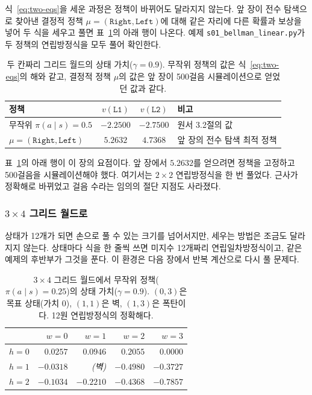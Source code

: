 \documentclass[11pt,a4paper]{article}
\newcommand{\Lone}{\texttt{L1}}
\newcommand{\Ltwo}{\texttt{L2}}
\begin{document}
식~\eqref{eq:two-eqs}을 세운 과정은 정책이 바뀌어도 달라지지 않는다. 앞 장이 전수 탐색으로 찾아낸
결정적 정책 $\mu=(\texttt{Right},\texttt{Left})$에 대해 같은 자리에 다른 확률과 보상을 넣어 두 식을
세우고 풀면 표~\ref{tab:two-square-values}의 아래 행이 나온다. 예제
\texttt{s01\_bellman\_linear.py}가 두 정책의 연립방정식을 모두 풀어 확인한다.

\begin{table}[htbp]
\centering
\caption{두 칸짜리 그리드 월드의 상태 가치($\gamma=0.9$). 무작위 정책의 값은 식~\eqref{eq:two-eqs}의 해와
같고, 결정적 정책 $\mu$의 값은 앞 장이 500걸음 시뮬레이션으로 얻었던 값과 같다.}
\label{tab:two-square-values}
\small
\begin{tabular}{@{}lccl@{}}
\toprule
정책 & $v(\Lone)$ & $v(\Ltwo)$ & 비고 \\
\midrule
무작위 $\pi(a\mid s)=0.5$                       & $-2.2500$ & $-2.7500$ & 원서 3.2절의 값 \\
$\mu=(\texttt{Right},\texttt{Left})$            & $5.2632$  & $4.7368$  & 앞 장의 전수 탐색 최적 정책 \\
\bottomrule
\end{tabular}
\end{table}

표~\ref{tab:two-square-values}의 아래 행이 이 장의 요점이다. 앞 장에서 $5.2632$를 얻으려면 정책을 고정하고
500걸음을 시뮬레이션해야 했다. 여기서는 $2\times2$ 연립방정식을 한 번 풀었다. 근사가 정확해로 바뀌었고
걸음 수라는 임의의 절단 지점도 사라졌다.

\subsubsection{\texorpdfstring{$3\times4$}{3x4} 그리드 월드로}

상태가 12개가 되면 손으로 풀 수 있는 크기를 넘어서지만, 세우는 방법은 조금도 달라지지 않는다. 상태마다
식을 한 줄씩 쓰면 미지수 12개짜리 연립일차방정식이고, 같은 예제의 후반부가 그것을 푼다. 이 환경은 다음
장에서 반복 계산으로 다시 풀 문제다.

\begin{table}[htbp]
\centering
\caption{$3\times4$ 그리드 월드에서 무작위 정책($\pi(a\mid s)=0.25$)의 상태 가치($\gamma=0.9$).
$(0,3)$은 목표 상태(가치 $0$), $(1,1)$은 벽, $(1,3)$은 폭탄이다. 12원 연립방정식의 정확해다.}
\label{tab:grid-random}
\small
\begin{tabular}{@{}lrrrr@{}}
\toprule
 & $w=0$ & $w=1$ & $w=2$ & $w=3$ \\
\midrule
$h=0$ & $0.0257$  & $0.0946$  & $0.2055$  & $0.0000$ \\
$h=1$ & $-0.0318$ & \textit{(벽)} & $-0.4980$ & $-0.3727$ \\
$h=2$ & $-0.1034$ & $-0.2210$ & $-0.4368$ & $-0.7857$ \\
\bottomrule
\end{tabular}
\end{table}
\end{document}
